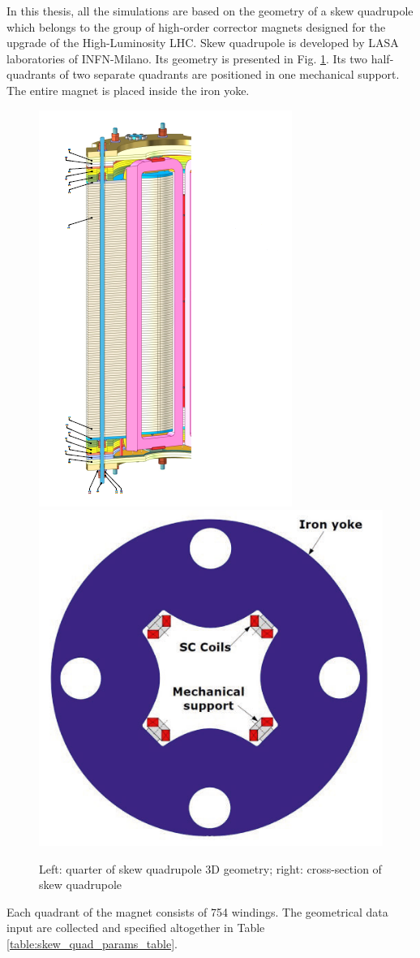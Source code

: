 
In this thesis, all the simulations are based on the geometry of a skew quadrupole which belongs to the group of high-order corrector magnets designed for the upgrade of the High-Luminosity LHC. Skew quadrupole is developed by LASA laboratories of INFN-Milano. Its geometry is presented in Fig. \ref{fig:Skew_quad_geometry}. Its two half-quadrants of two separate quadrants are positioned in one mechanical support. The entire magnet is placed inside the iron yoke. 

\begin{figure}[h!]
    \centering
    \includegraphics[width=0.25\linewidth]{sections/1D_quench_modelling/figures/geometry/SkewQuad3D.png}
    \includegraphics[width=0.30\linewidth]{sections/1D_quench_modelling/figures/geometry/Quadrupole_Cross_Section.png}
    \caption{Left: quarter of skew quadrupole 3D geometry; right: cross-section of skew quadrupole \cite{hl_lhc_tech_design_report_v01}}
    \label{fig:Skew_quad_geometry}
\end{figure}

Each quadrant of the magnet consists of 754 windings. The geometrical data input are collected and specified altogether in Table \ref{table:skew_quad_params_table}.


